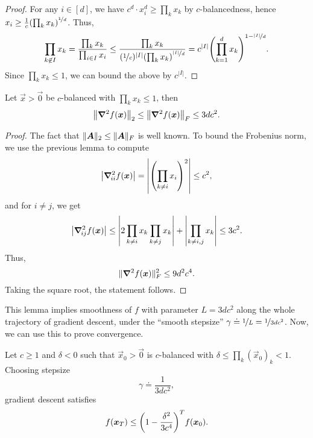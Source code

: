 \begin{proof}
    For any $i\in [d]$, we have $c^d \cdot x_i^d \geq \prod_k x_k$ by
    $c$-balancedness, hence $x_i \geq \frac{1}{c} \lft( \prod_k x_k \rgt)^{\nicefrac{1}{d}}$. Thus, \[
        \prod_{k \not\in I} x_k = \frac{\prod_{k} x_k}{\prod_{i \in I} x_i} \leq \frac{\prod_{k} x_k}{(\nicefrac{1}{c})^{|I|} \lft( \prod_{k} x_k \rgt)^{\nicefrac{|I|}{d}}} = c^{|I|} \lft( \prod_{k=1}^{d} x_k \rgt)^{1-\nicefrac{|I|}{d}}.
    \]
    Since $\prod_k x_k \leq 1$, we can bound the above by $c^{|I|}$.
\end{proof}

\begin{lemma}
    Let $\vec{x} > \vec{0}$ be $c$-balanced with $\prod_k x_k \leq 1$, then \[
        \lft\| \hess{f(\vec{x})}{} \rgt\|_2 \leq \lft\| \hess{f(\vec{x})}{} \rgt\|_F \leq 3 d c^2.
    \]
\end{lemma}

\begin{proof}
    The fact that $\| \bm{A} \|_2 \leq \| \bm{A} \|_F$ is well known. To bound the Frobenius norm, we
    use the previous lemma to compute \[
        \lft|\hess{f(\vec{x})}{ii}\rgt| = \lft| \lft( \prod_{k \neq i} x_i \rgt)^2 \rgt| \leq c^2,
    \]
    and for $i \neq j$, we get \[
        \lft| \hess{f(\vec{x})}{ij} \rgt| \leq \lft| 2 \prod_{k \neq i} x_k \prod_{k \neq j} x_k \rgt| + \lft| \prod_{k\neq i,j} x_k \rgt| \leq 3c^2.
    \]
    Thus, \[
        \| \bm{\nabla}^2_{\! } f(\bm{x}) \|_F^2 \leq 9d^2 c^4.
    \]
    Taking the square root, the statement follows.
\end{proof}

This lemma implies smoothness of $f$ with parameter $L=3dc^2$ along the whole trajectory of
gradient descent, under the ``smooth stepsize'' $\gamma \doteq \nicefrac{1}{L} =
    \nicefrac{1}{3dc^2}$. Now, we can use this to prove convergence.

\begin{theorem}
    Let $c \geq 1$ and $\delta < 0$ such that $\vec{x}_0 > \vec{0}$ is $c$-balanced with
    $\delta \leq \prod_k (\vec{x}_0)_k < 1$. Choosing stepsize \[
        \gamma \doteq \frac{1}{3dc^2},
    \]
    gradient descent satisfies \[
        f(\vec{x}_T) \leq \lft( 1- \frac{\delta^2}{3c^4} \rgt)^T f(\vec{x}_0).
    \]
\end{theorem}

